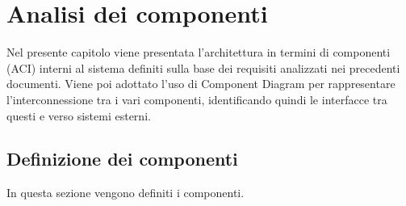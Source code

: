 \section{Analisi dei componenti}
\label{secD2:AnalisiDeiComponenti}

Nel presente capitolo viene presentata l'architettura in termini di componenti (ACI) interni al sistema definiti sulla base dei requisiti analizzati nei precedenti documenti. Viene poi adottato l'uso di Component Diagram per rappresentare l'interconnessione tra i vari componenti, identificando quindi le interfacce tra questi e verso sistemi esterni.

\subsection{Definizione dei componenti}
In questa sezione vengono definiti i componenti.

